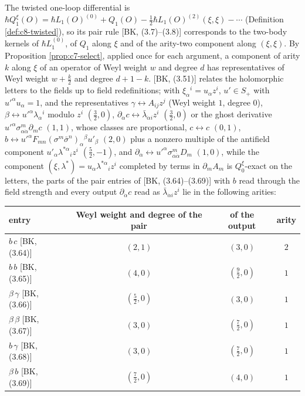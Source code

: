 \begin{remark}
\label{rem:c11-twist}
The twisted one-loop differential is $\hbar Q^\xi_1(O)=\hbar L_1(O)^{(0)}+Q_1(O)-\tfrac12\hbar L_1(O)^{(2)}(\xi,\xi)-\cdots$ (Definition \ref{def:c8-twisted}), so its pair rule [BK, (3.7)--(3.8)] corresponds to the two-body kernels of $\hbar L_1^{(0)}$, of $Q_1$ along $\xi$ and of the arity-two component along $(\xi,\xi)$. By Proposition \ref{prop:c7-select}, applied once for each argument, a component of arity $k$ along $\xi$ of an operator of Weyl weight $w$ and degree $d$ has representatives of Weyl weight $w+\tfrac k2$ and degree $d+1-k$. [BK, (3.51)] relates the holomorphic letters to the fields up to field redefinitions; with $\xi_\alpha{}^i=u_\alpha z^i$, $u'\in S_+$ with $u'^\alpha u_\alpha=1$, and the representatives $\gamma\leftrightarrow A_{ij}z^j$ (Weyl weight $1$, degree $0$), $\beta\leftrightarrow u'^\alpha\lambda_\alpha{}^i$ modulo $z^i$ $(\tfrac32,0)$, $\partial_{\dot\alpha}c\leftrightarrow\bar\lambda_{\dot\alpha i}z^i$ $(\tfrac32,0)$ or the ghost derivative $u'^\alpha\sigma^m_{\alpha\dot\alpha}\partial_mc$ $(1,1)$, whose classes are proportional, $c\leftrightarrow c$ $(0,1)$, $b\leftrightarrow u'^\alpha F_{mn}(\sigma^m\bar\sigma^n)_\alpha{}^\beta u'_\beta$ $(2,0)$ plus a nonzero multiple of the antifield component $u'_\alpha\lambda^{*\alpha}{}_iz^i$ $(\tfrac52,-1)$, and $\partial_{\dot\alpha}\leftrightarrow u'^\alpha\sigma^m_{\alpha\dot\alpha}D_m$ $(1,0)$, while the component $(\xi,\lambda^*)=u_\alpha\lambda^{*\alpha}{}_iz^i$ completed by terms in $\partial_mA_m$ is $Q^\xi_0$-exact on the letters, the parts of the pair entries of [BK, (3.64)--(3.69)] with $b$ read through the field strength and every output $\partial_{\dot\alpha}c$ read as $\bar\lambda_{\dot\alpha i}z^i$ lie in the following arities:

\begin{tabular}{l|c|c|c}
entry & Weyl weight and degree of the pair & of the output & arity\\
\hline
$b\,c$ [BK, (3.64)] & $(2,1)$ & $(3,0)$ & $2$\\
$b\,b$ [BK, (3.65)] & $(4,0)$ & $(\tfrac92,0)$ & $1$\\
$\beta\,\gamma$ [BK, (3.66)] & $(\tfrac52,0)$ & $(3,0)$ & $1$\\
$\beta\,\beta$ [BK, (3.67)] & $(3,0)$ & $(\tfrac72,0)$ & $1$\\
$b\,\gamma$ [BK, (3.68)] & $(3,0)$ & $(\tfrac72,0)$ & $1$\\
$\beta\,b$ [BK, (3.69)] & $(\tfrac72,0)$ & $(4,0)$ & $1$\\
\end{tabular}


\end{remark}
